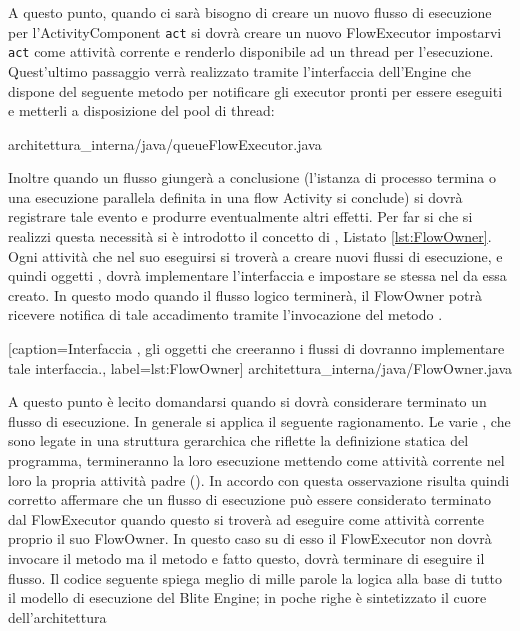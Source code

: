 A questo punto, quando ci sarà bisogno di creare un nuovo flusso di esecuzione
per l'ActivityComponent \texttt{act} si dovrà creare un nuovo FlowExecutor
impostarvi \texttt{act} come attività corrente e renderlo disponibile ad un thread per
l'esecuzione. Quest'ultimo passaggio verrà realizzato tramite l'interfaccia
dell'Engine che dispone del seguente metodo per notificare gli executor pronti
per essere eseguiti e metterli a disposizione del pool di thread:

\lstset{frame=NONE}
 {architettura_interna/java/queueFlowExecutor.java}
\lstset{frame=tblr}

Inoltre quando un flusso giungerà a conclusione (l'istanza di processo termina o
una esecuzione parallela definita in una flow Activity si conclude) si dovrà
registrare tale evento e produrre eventualmente altri effetti. Per far si che si
realizzi questa necessità si \`e introdotto il concetto di ,
Listato \ref{lst:FlowOwner}. Ogni attività che nel suo eseguirsi si
troverà a creare nuovi flussi di esecuzione, e quindi oggetti ,  dovrà implementare
l'interfaccia  e impostare se stessa nel 
da essa creato. In questo modo quando il flusso logico terminerà, il FlowOwner potrà
ricevere notifica di tale accadimento tramite l'invocazione del metodo
.


[caption={Interfaccia , gli oggetti che creeranno i flussi di
dovranno implementare tale interfaccia.}, label=lst:FlowOwner]
{architettura_interna/java/FlowOwner.java}

A questo punto \`e lecito domandarsi quando si dovrà considerare terminato un
flusso di esecuzione. In generale si applica il seguente ragionamento. Le varie
, che sono legate in una struttura gerarchica che
riflette la definizione statica del programma, termineranno la loro esecuzione
mettendo come attività corrente nel loro  la propria
attività padre (). In accordo con questa osservazione
risulta quindi corretto affermare che un flusso di esecuzione può essere considerato terminato dal
FlowExecutor quando questo si troverà ad eseguire come attività corrente proprio
il suo FlowOwner. In questo caso su di esso il FlowExecutor non dovrà invocare il
metodo  ma il metodo  e fatto questo,
dovrà terminare di eseguire il flusso. Il codice seguente spiega meglio di mille parole la logica
alla base di tutto il modello di esecuzione del Blite Engine; in poche righe \`e
sintetizzato il cuore dell'architettura

